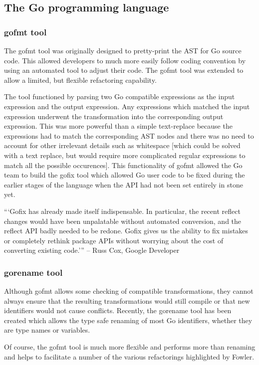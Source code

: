 \subsection{The Go programming language}
\subsubsection{gofmt tool}
The gofmt tool was originally designed to pretty-print the AST for Go source code. This allowed developers to much more easily follow coding convention by using an automated tool to adjust their code. The gofmt tool was extended to allow a limited, but flexible refactoring capability. 

The tool functioned by parsing two Go compatible expressions as the input expression and the output expression. Any expressions which matched the input expression underwent the transformation into the corresponding output expression. This was more powerful than a simple text-replace because the expressions had to match the corresponding AST nodes and there was no need to account for other irrelevant details such as whitespace [which could be solved with a text replace, but would require more complicated regular expressions to match all the possible occurences]. This functionality of gofmt allowed the Go team to build the gofix tool which allowed Go user code to be fixed during the earlier stages of the language when the API had not been set entirely in stone yet.

```Gofix has already made itself indispensable. In particular, the recent reflect changes would have been unpalatable without automated conversion, and the reflect API badly needed to be redone. Gofix gives us the ability to fix mistakes or completely rethink package APIs without worrying about the cost of converting existing code.''' -- Russ Cox, Google Developer

\subsubsection{gorename tool}
Although gofmt allows some checking of compatible transformations, they cannot always ensure that the resulting transformations would still compile or that new identifiers would not cause conflicts. Recently, the gorename tool has been created which allows the type safe renaming of most Go identifiers, whether they are type names or variables.

Of course, the gofmt tool is much more flexible and performs more than renaming and helps to facilitate a number of the various refactorings highlighted by Fowler.

